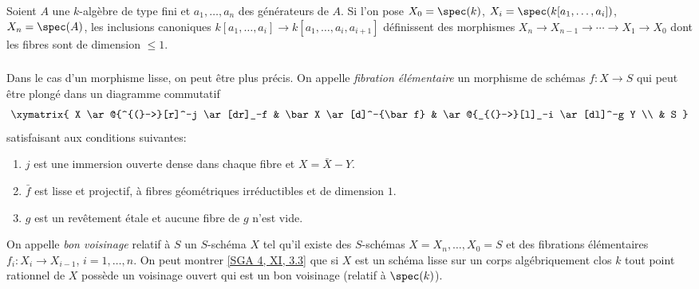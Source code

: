 \subsubsection{}\label{I:3-4-1}

Soient $A$ une $k$-algèbre de type fini et $a_1,\dotsc,a_n$ des générateurs de 
$A$. Si l'on pose $X_0=\spec(k)$, $X_i=\spec(k[a_1,\dotsc,a_i])$, 
$X_n=\spec(A)$, les inclusions canoniques 
$k[a_1,\dotsc,a_i]\to k[a_1,\dotsc,a_i,a_{i+1}]$ définissent des morphismes 
$X_n \to X_{n-1} \to \cdots \to X_1 \to X_0$ dont les fibres sont de dimension 
$\leqslant 1$. 





\subsubsection{}\label{I:3-4-2}

Dans le cas d'un morphisme lisse, on peut être plus précis. On appelle 
\emph{fibration élémentaire} un morphisme de schémas $f:X\to S$ qui peut 
être plongé dans un diagramme commutatif
\[\xymatrix{
  X \ar@{^{(}->}[r]^-j \ar[dr]_-f
    & \bar X \ar[d]^-{\bar f}
    & \ar@{_{(}->}[l]_-i \ar[dl]^-g Y \\
  & S
}\]
satisfaisant aux conditions suivantes:
\begin{enumerate}[\indent i)]
  \item $j$ est une immersion ouverte dense dans chaque fibre et 
    $X=\bar X - Y$. 
  \item $\bar f$ est lisse et projectif, à fibres géométriques 
    irréductibles et de dimension $1$.
  \item $g$ est un revêtement étale et aucune fibre de $g$ n'est vide.
\end{enumerate}

On appelle \emph{bon voisinage} relatif à $S$ un $S$-schéma $X$ tel qu'il 
existe des $S$-schémas $X=X_n,\dotsc,X_0=S$ et des fibrations élémentaires 
$f_i:X_i\to X_{i-1}$, $i=1,\dotsc,n$. On peut montrer \hyperlink{cite.sga4}{[SGA 4, XI, 3.3]} que si 
$X$ est un schéma lisse sur un corps algébriquement clos $k$ tout point 
rationnel de $X$ possède un voisinage ouvert qui est un bon voisinage 
(relatif à $\spec(k)$). 





\subsubsection{}\label{I:3-4-3}

